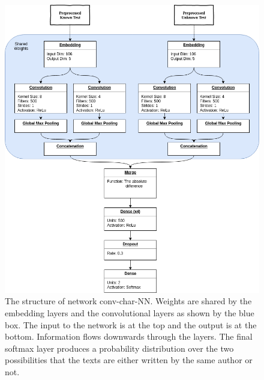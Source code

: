 \begin{figure}
    \centering
    \includegraphics[width=\textwidth]{./pictures/experiments/network3.png}
    \caption{The structure of network \gls{conv-char-NN}. Weights are
        shared by the embedding layers and the convolutional layers as shown by
        the blue box. The input to the network is at the top and the output is
        at the bottom. Information flows downwards through the layers. The final
        softmax layer produces a probability distribution over the two
        possibilities that the texts are either written by the same author or
        not.}
    \label{fig:conv-char-NN}
\end{figure}

